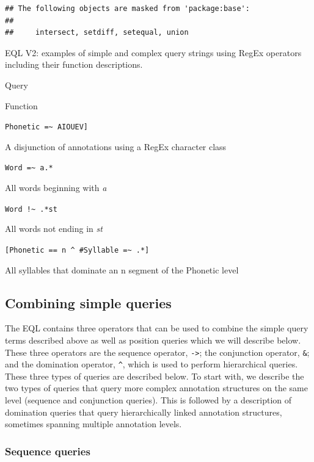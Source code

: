 \documentclass[]{book}
\theoremstyle{definition}
\theoremstyle{definition}
\theoremstyle{definition}
\theoremstyle{remark}
\begin{document}
\begin{verbatim}
## The following objects are masked from 'package:base':
## 
##     intersect, setdiff, setequal, union
\end{verbatim}

\label{tab:eqlExamples}EQL V2: examples of simple and complex query strings
using RegEx operators including their function descriptions.

Query

Function

\texttt{Phonetic\ =\textasciitilde{}\ \textquotesingle{}{[}AIOUEV{]}\textquotesingle{}}

A disjunction of annotations using a RegEx character class

\texttt{Word\ =\textasciitilde{}\ a.*}

All words beginning with \emph{a}

\texttt{Word\ !\textasciitilde{}\ .*st}

All words not ending in \emph{st}

\texttt{{[}Phonetic\ ==\ n\ \^{}\ \#Syllable\ =\textasciitilde{}\ .*{]}}

All syllables that dominate an n segment of the Phonetic level

\hypertarget{combining-simple-queries}{%
\subsection{Combining simple queries}\label{combining-simple-queries}}

The EQL contains three operators that can be used to combine the simple
query terms described above as well as position queries which we will
describe below. These three operators are the sequence operator,
\texttt{-\textgreater{}}; the conjunction operator, \texttt{\&}; and the
domination operator, \texttt{\^{}}, which is used to perform
hierarchical queries. These three types of queries are described below.
To start with, we describe the two types of queries that query more
complex annotation structures on the same level (sequence and
conjunction queries). This is followed by a description of domination
queries that query hierarchically linked annotation structures,
sometimes spanning multiple annotation levels.

\hypertarget{sequence-queries}{%
\subsubsection{Sequence queries}\label{sequence-queries}}
\end{document}
